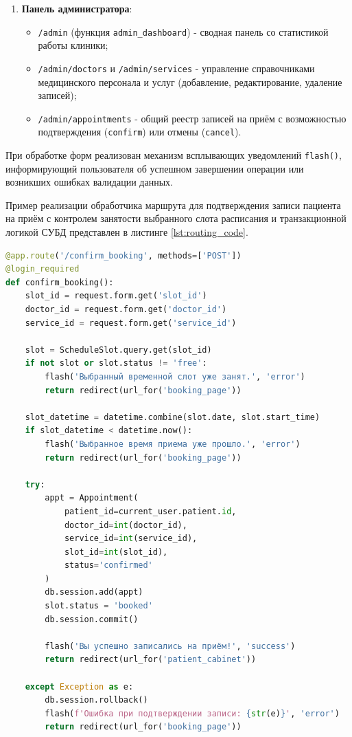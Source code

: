 \begin{enumerate}
    \item \textbf{Панель администратора}:
    \begin{itemize}
        \item \texttt{/admin} (функция \texttt{admin\_dashboard}) - сводная панель со статистикой работы клиники;
        \item \texttt{/admin/doctors} и \texttt{/admin/services} - управление справочниками медицинского персонала и услуг (добавление, редактирование, удаление записей);
        \item \texttt{/admin/appointments} - общий реестр записей на приём с возможностью подтверждения (\texttt{confirm}) или отмены (\texttt{cancel}).
    \end{itemize}
\end{enumerate}

При обработке форм реализован механизм всплывающих уведомлений \texttt{flash()}, информирующий пользователя об успешном завершении операции или возникших ошибках валидации данных.

\newpage

Пример реализации обработчика маршрута для подтверждения записи пациента на приём с контролем занятости выбранного слота расписания и транзакционной логикой СУБД представлен в листинге \ref{lst:routing_code}.

\begin{lstlisting}[language=Python, caption={Реализация маршрута подтверждения записи в clinic\_app/app.py}, label={lst:routing_code}]
@app.route('/confirm_booking', methods=['POST'])
@login_required
def confirm_booking():
    slot_id = request.form.get('slot_id')
    doctor_id = request.form.get('doctor_id')
    service_id = request.form.get('service_id')
    
    slot = ScheduleSlot.query.get(slot_id)
    if not slot or slot.status != 'free':
        flash('Выбранный временной слот уже занят.', 'error')
        return redirect(url_for('booking_page'))
        
    slot_datetime = datetime.combine(slot.date, slot.start_time)
    if slot_datetime < datetime.now():
        flash('Выбранное время приема уже прошло.', 'error')
        return redirect(url_for('booking_page'))
        
    try:
        appt = Appointment(
            patient_id=current_user.patient.id,
            doctor_id=int(doctor_id),
            service_id=int(service_id),
            slot_id=int(slot_id),
            status='confirmed'
        )
        db.session.add(appt)
        slot.status = 'booked'
        db.session.commit()
        
        flash('Вы успешно записались на приём!', 'success')
        return redirect(url_for('patient_cabinet'))
        
    except Exception as e:
        db.session.rollback()
        flash(f'Ошибка при подтверждении записи: {str(e)}', 'error')
        return redirect(url_for('booking_page'))
\end{lstlisting}

